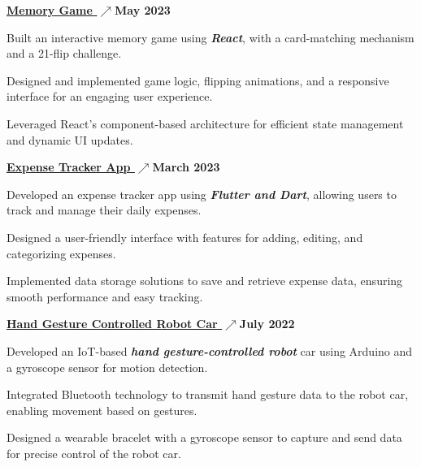 \documentclass[letterpaper,10pt]{article}
\newcommand{\heading}[2]{
  \hspace{10pt}#1\hfill#2\\
}
\newcommand{\headingBf}[2]{
  \heading{\textbf{#1}}{\textbf{#2}}
}
\newenvironment{resume_list}{
  \vspace{-7pt}
  \begin{itemize}[itemsep=-2px, parsep=1pt, leftmargin=30pt]
}{
  \end{itemize}
}
\begin{document}
    \headingBf {\underline{\href{https://github.com/surajkr97/MemoryGame/tree/master/matchthecards}{Memory Game \(\nearrow\)}}}{May 2023}  \vspace{4pt}
    \begin{resume_list}
    \item Built an interactive memory game using \textit{\textbf{React}}, with a card-matching mechanism and a 21-flip challenge.
    \item Designed and implemented game logic, flipping animations, and a responsive interface for an engaging user experience.
    \item Leveraged React’s component-based architecture for efficient state management and dynamic UI updates.
    \end{resume_list}
    
    \headingBf {\underline{\href{https://github.com/surajkr97/Expense-Tracker-App}{Expense Tracker App \(\nearrow\)}}}{March 2023}  \vspace{4pt}
    \begin{resume_list}
    \item Developed an expense tracker app using \textit{\textbf{Flutter and Dart}}, allowing users to track and manage their daily expenses.
    \item Designed a user-friendly interface with features for adding, editing, and categorizing expenses.
    \item Implemented data storage solutions to save and retrieve expense data, ensuring smooth performance and easy tracking.
  \end{resume_list}

    \headingBf {\underline{\href{https://surajkr97.hashnode.dev/exploring-the-world-of-iot-from-robo-cars-to-robo-warrior?source=more_articles_bottom_blogs}{Hand Gesture Controlled Robot Car \(\nearrow\)}}}{July 2022}  \vspace{4pt}
    \begin{resume_list}
    \item Developed an IoT-based \textit{\textbf{hand gesture-controlled robot}} car using Arduino and a gyroscope sensor for motion detection.
    \item Integrated Bluetooth technology to transmit hand gesture data to the robot car, enabling movement based on gestures.
    \item Designed a wearable bracelet with a gyroscope sensor to capture and send data for precise control of the robot car.
  \end{resume_list}
\end{document}
